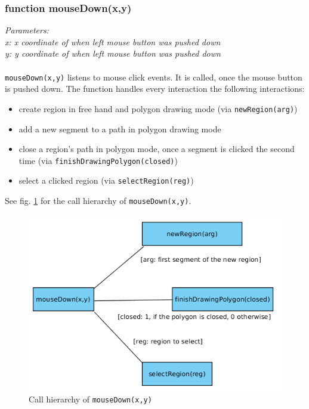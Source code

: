 \subsubsection{function mouseDown(x,y)}
\emph{Parameters:\\
	x: x coordinate of when left mouse button was pushed down\\
	y: y coordinate of when left mouse button was pushed down\\ \\
}
\texttt{mouseDown(x,y)} listens to mouse click events. It is called, once the mouse button is pushed down. The function handles every interaction the following interactions:
\begin{itemize}
	\item create region in free hand and polygon drawing mode (via \texttt{newRegion(arg)})
	\item add a new segment to a path in polygon drawing mode
	\item close a region's path in polygon mode, once a segment is clicked the second time (via \texttt{finishDrawingPolygon(closed)})
	\item select a clicked region (via \texttt{selectRegion(reg)})
\end{itemize}

See fig. \ref{figB_mouseDown} for the call hierarchy of \texttt{mouseDown(x,y)}.

\begin{figure}[H]
	\begin{center}
		\includegraphics[scale=0.5]{img/ch_mouseDown.png}
		\caption{Call hierarchy of \texttt{mouseDown(x,y)}}
		\label{figB_mouseDown}
	\end{center}
\end{figure}


